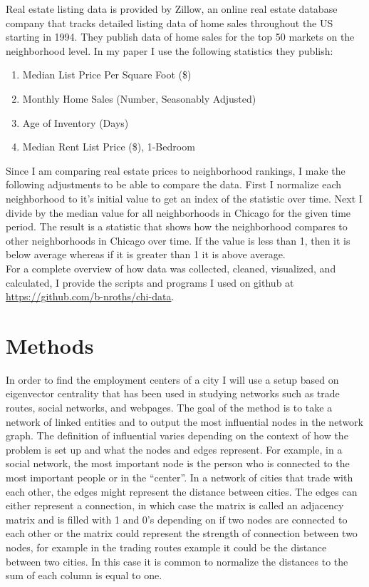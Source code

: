 \documentclass{article}
\theoremstyle{definition}
\theoremstyle{remark}
\begin{document}
Real estate listing data is provided by Zillow, an online real estate database company that tracks detailed listing data of home sales throughout the US starting in 1994.  They publish data of home sales for the top 50 markets on the neighborhood level.  In my paper I use the following statistics they publish:
\begin{enumerate}
\item Median List Price Per Square Foot (\$)
\item Monthly Home Sales (Number, Seasonably Adjusted)
\item Age of Inventory (Days)
\item Median Rent List Price (\$), 1-Bedroom
\end{enumerate}
Since I am comparing real estate prices to neighborhood rankings, I make the following adjustments to be able to compare the data.  First I normalize each neighborhood to it's initial value to get an index of the statistic over time.  Next I divide by the median value for all neighborhoods in Chicago for the given time period.  The result is a statistic that shows how the neighborhood compares to other neighborhoods in Chicago over time.  If the value is less than 1, then it is below average whereas if it is greater than 1 it is above average. \\
For a complete overview of how data was collected, cleaned, visualized, and calculated, I provide the scripts and programs I used on github at \url{https://github.com/b-nroths/chi-data}. 

\section{Methods}
In order to find the employment centers of a city I will use a setup based on eigenvector centrality that has been used in studying networks such as trade routes, social networks, and webpages.  The goal of the method is to take a network of linked entities and to output the most influential nodes in the network graph.  The definition of influential varies depending on the context of how the problem is set up and what the nodes and edges represent.  For example, in a social network, the most important node is the person who is connected to the most important people or in the “center”.  In a network of cities that trade with each other, the edges might represent the distance between cities.  The edges can either represent a connection, in which case the matrix is called an adjacency matrix and is filled with 1 and 0’s depending on if two nodes are connected to each other or the matrix could represent the strength of connection between two nodes, for example in the trading routes example it could be the distance between two cities.  In this case it is common to normalize the distances to the sum of each column is equal to one. \\
\end{document}
